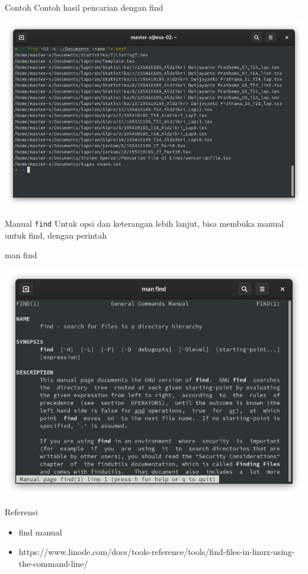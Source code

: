 \documentclass{beamer}
\begin{document}
\begin{frame}{Contoh}
	Contoh hasil pencarian dengan find\\
	\begin{center}
		\includegraphics[scale=.3]{img2}
	\end{center}
\end{frame}

\begin{frame}{Manual \texttt{find}}
	Untuk opsi dan keterangan lebih lanjut, bisa membuka manual untuk find, dengan perintah
	\begin{tcolorbox}
		man find
	\end{tcolorbox}
	\begin{center}
		\includegraphics[scale=.25]{img4}
	\end{center}
\end{frame}

\begin{frame}{Referensi}
	\begin{itemize}
		\item find manual
		\item https://www.linode.com/docs/tools-reference/tools/find-files-in-linux-using-the-command-line/
	\end{itemize}
	
\end{frame}
\end{document}

